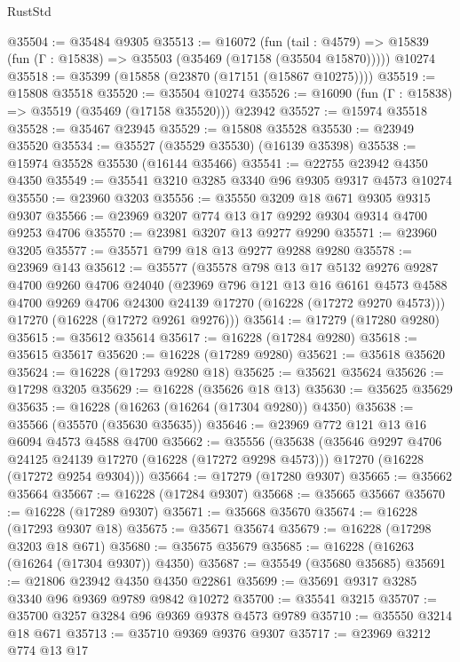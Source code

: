 \begin{lexlean}{RustStd}
\begin{coremodule}
@35504 := @35484 @9305
@35513 := @16072
    (fun (tail : @4579) => @15839 (fun (Γ : @15838) => @35503 (@35469 (@17158 (@35504 @15870)))))
    @10274
@35518 := @35399 (@15858 (@23870 (@17151 (@15867 @10275))))
@35519 := @15808 @35518
@35520 := @35504 @10274
@35526 := @16090 (fun (Γ : @15838) => @35519 (@35469 (@17158 @35520))) @23942
@35527 := @15974 @35518
@35528 := @35467 @23945
@35529 := @15808 @35528
@35530 := @23949 @35520
@35534 := @35527 (@35529 @35530) (@16139 @35398)
@35538 := @15974 @35528 @35530 (@16144 @35466)
@35541 := @22755 @23942 @4350 @4350
@35549 := @35541 @3210 @3285 @3340 @96 @9305 @9317 @4573 @10274
@35550 := @23960 @3203
@35556 := @35550 @3209 @18 @671 @9305 @9315 @9307
@35566 := @23969 @3207 @774 @13 @17 @9292 @9304 @9314 @4700 @9253 @4706
@35570 := @23981 @3207 @13 @9277 @9290
@35571 := @23960 @3205
@35577 := @35571 @799 @18 @13 @9277 @9288 @9280
@35578 := @23969 @143
@35612 := @35577
    (@35578
      @798
      @13
      @17
      @5132
      @9276
      @9287
      @4700
      @9260
      @4706
      @24040
      (@23969
        @796
        @121
        @13
        @16
        @6161
        @4573
        @4588
        @4700
        @9269
        @4706
        @24300
        @24139
        @17270
        (@16228 (@17272 @9270 @4573)))
      @17270
      (@16228 (@17272 @9261 @9276)))
@35614 := @17279 (@17280 @9280)
@35615 := @35612 @35614
@35617 := @16228 (@17284 @9280)
@35618 := @35615 @35617
@35620 := @16228 (@17289 @9280)
@35621 := @35618 @35620
@35624 := @16228 (@17293 @9280 @18)
@35625 := @35621 @35624
@35626 := @17298 @3205
@35629 := @16228 (@35626 @18 @13)
@35630 := @35625 @35629
@35635 := @16228 (@16263 (@16264 (@17304 @9280)) @4350)
@35638 := @35566 (@35570 (@35630 @35635))
@35646 := @23969 @772 @121 @13 @16 @6094 @4573 @4588 @4700
@35662 := @35556
    (@35638
      (@35646 @9297 @4706 @24125 @24139 @17270 (@16228 (@17272 @9298 @4573)))
      @17270
      (@16228 (@17272 @9254 @9304)))
@35664 := @17279 (@17280 @9307)
@35665 := @35662 @35664
@35667 := @16228 (@17284 @9307)
@35668 := @35665 @35667
@35670 := @16228 (@17289 @9307)
@35671 := @35668 @35670
@35674 := @16228 (@17293 @9307 @18)
@35675 := @35671 @35674
@35679 := @16228 (@17298 @3203 @18 @671)
@35680 := @35675 @35679
@35685 := @16228 (@16263 (@16264 (@17304 @9307)) @4350)
@35687 := @35549 (@35680 @35685)
@35691 := @21806 @23942 @4350 @4350 @22861
@35699 := @35691 @9317 @3285 @3340 @96 @9369 @9789 @9842 @10272
@35700 := @35541 @3215
@35707 := @35700 @3257 @3284 @96 @9369 @9378 @4573 @9789
@35710 := @35550 @3214 @18 @671
@35713 := @35710 @9369 @9376 @9307
@35717 := @23969 @3212 @774 @13 @17

\end{coremodule}
\end{lexlean}
